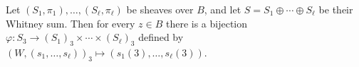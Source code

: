 Let $(S_1, \pi_1), \ldots, (S_\ell, \pi_\ell)$ be sheaves over $B$, and let $S = S_1 \oplus \cdots \oplus S_\ell$ be their Whitney sum. Then for every $z \in B$ there is a bijection $\varphi: S_3 \rightarrow (S_1)_3 \times \cdots \times (S_\ell)_3$ defined by $(W, (s_1, \ldots, s_\ell))_3 \mapsto (s_1(3), \ldots, s_\ell(3))$.
